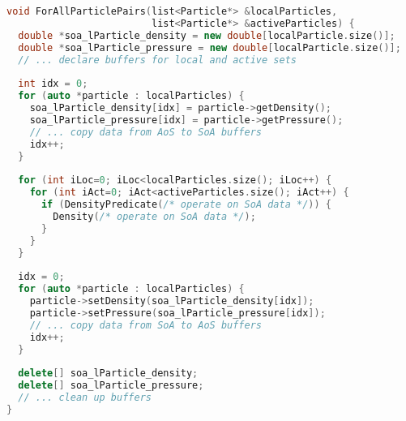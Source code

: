 \algrenewcommand\algorithmicindent{0.4em}%

\begin{lstlisting}[language=C++,
                   label=algorithm:demonstrator:blueprint-rewritten,
                   caption=Manual rewrite of the blueprint code from Listing~\ref{algorithm:demonstrator:blueprint} into a temporal local variant,
                   basicstyle=\footnotesize]
void ForAllParticlePairs(list<Particle*> &localParticles,
                         list<Particle*> &activeParticles) {
  double *soa_lParticle_density = new double[localParticle.size()];
  double *soa_lParticle_pressure = new double[localParticle.size()];
  // ... declare buffers for local and active sets
  
  int idx = 0;
  for (auto *particle : localParticles) {
    soa_lParticle_density[idx] = particle->getDensity();
    soa_lParticle_pressure[idx] = particle->getPressure();
    // ... copy data from AoS to SoA buffers
    idx++;
  }
  
  for (int iLoc=0; iLoc<localParticles.size(); iLoc++) {
    for (int iAct=0; iAct<activeParticles.size(); iAct++) {
      if (DensityPredicate(/* operate on SoA data */)) {
        Density(/* operate on SoA data */);
      }
    }
  }
  
  idx = 0;
  for (auto *particle : localParticles) {
    particle->setDensity(soa_lParticle_density[idx]);
    particle->setPressure(soa_lParticle_pressure[idx]);
    // ... copy data from SoA to AoS buffers
    idx++;
  }
  
  delete[] soa_lParticle_density;
  delete[] soa_lParticle_pressure;
  // ... clean up buffers
}
\end{lstlisting}

